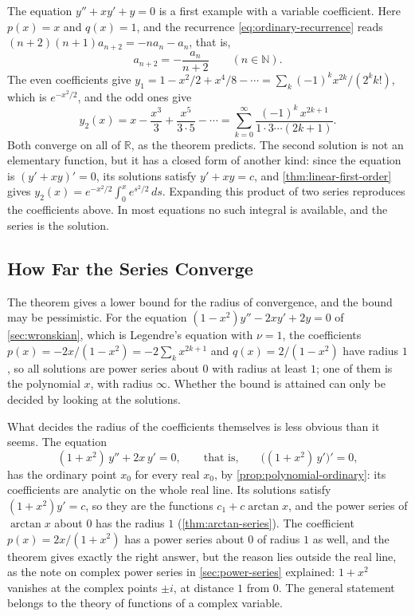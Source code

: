 The equation $y''+xy'+y=0$ is a first example with a variable coefficient. Here $p(x)=x$ and $q(x)=1$, and the recurrence \eqref{eq:ordinary-recurrence} reads $(n+2)(n+1)a_{n+2}=-na_n-a_n$, that is,
\[
a_{n+2}=-\frac{a_n}{n+2}\qquad(n\in\mathbb N).
\]
The even coefficients give $y_1=1-x^2/2+x^4/8-\cdots=\sum_k(-1)^kx^{2k}/(2^kk!)$, which is $e^{-x^2/2}$, and the odd ones give
\[
y_2(x)=x-\frac{x^3}3+\frac{x^5}{3\cdot5}-\cdots=\sum_{k=0}^\infty\frac{(-1)^k\,x^{2k+1}}{1\cdot3\cdots(2k+1)} .
\]
Both converge on all of $\mathbb R$, as the theorem predicts. The second solution is not an elementary function, but it has a closed form of another kind: since the equation is $(y'+xy)'=0$, its solutions satisfy $y'+xy=c$, and \cref{thm:linear-first-order} gives $y_2(x)=e^{-x^2/2}\int_0^xe^{s^2/2}\,ds$. Expanding this product of two series reproduces the coefficients above. In most equations no such integral is available, and the series is the solution.

\subsection{How Far the Series Converge}

The theorem gives a lower bound for the radius of convergence, and the bound may be pessimistic. For the equation $(1-x^2)y''-2xy'+2y=0$ of \cref{sec:wronskian}, which is Legendre's equation with $\nu=1$, the coefficients $p(x)=-2x/(1-x^2)=-2\sum_kx^{2k+1}$ and $q(x)=2/(1-x^2)$ have radius $1$, so all solutions are power series about $0$ with radius at least $1$; one of them is the polynomial $x$, with radius $\infty$. Whether the bound is attained can only be decided by looking at the solutions.

What decides the radius of the coefficients themselves is less obvious than it seems. The equation
\[
(1+x^2)\,y''+2x\,y'=0,\qquad\text{that is,}\qquad\bigl((1+x^2)\,y'\bigr)'=0 ,
\]
has the ordinary point $x_0$ for every real $x_0$, by \cref{prop:polynomial-ordinary}: its coefficients are analytic on the whole real line. Its solutions satisfy $(1+x^2)y'=c$, so they are the functions $c_1+c\arctan x$, and the power series of $\arctan x$ about $0$ has the radius $1$ (\cref{thm:arctan-series}). The coefficient $p(x)=2x/(1+x^2)$ has a power series about $0$ of radius $1$ as well, and the theorem gives exactly the right answer, but the reason lies outside the real line, as the note on complex power series in \cref{sec:power-series} explained: $1+x^2$ vanishes at the complex points $\pm i$, at distance $1$ from $0$. The general statement belongs to the theory of functions of a complex variable.

